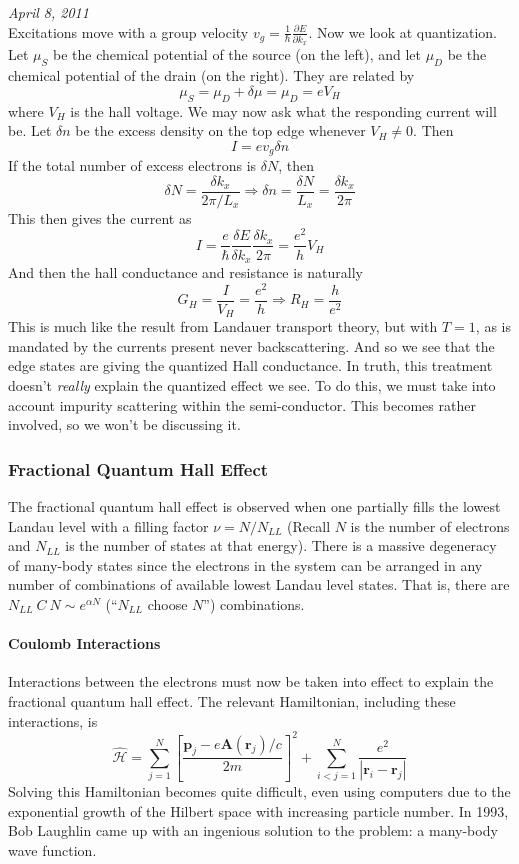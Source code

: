 \documentclass{article}
\begin{document}
	\noindent \textit{April 8, 2011}\\
	
	\noindent Excitations move with a group velocity $v_g=\frac{1}{\hbar}\frac{\partial E}{\partial k_x}$. Now we look at quantization. Let $\mu_S$ be the chemical potential of the source (on the left), and let $\mu_D$ be the chemical potential of the drain (on the right). They are related by
	$$\mu_S=\mu_D+\delta\mu=\mu_D=eV_H$$
	where $V_H$ is the hall voltage. We may now ask what the responding current will be. Let $\delta n$ be the excess density on the top edge whenever $V_H\neq 0$. Then 
	$$I=ev_g\delta n$$
	If the total number of excess electrons is $\delta N$, then
	$$\delta N=\frac{\delta k_x}{2\pi/L_x}\Rightarrow \delta n=\frac{\delta N}{L_x}=\frac{\delta k_x}{2\pi}$$
	This then gives the current as
	$$I=\frac{e}{\hbar}\frac{\delta E}{\delta k_x}\frac{\delta k_x}{2\pi}=\frac{e^2}{h}V_{H}$$
	And then the hall conductance and resistance is naturally
	$$G_H=\frac{I}{V_H}=\frac{e^2}{h}\Rightarrow R_H=\frac{h}{e^2}$$
	This is much like the result from Landauer transport theory, but with $T=1$, as is mandated by the currents present never backscattering. And so we see that the edge states are giving the quantized Hall conductance. In truth, this treatment doesn't \emph{really} explain the quantized effect we see. To do this, we must take into account impurity scattering within the semi-conductor. This becomes rather involved, so we won't be discussing it.
	
	\subsubsection{Fractional Quantum Hall Effect}
	The fractional quantum hall effect is observed when one partially fills the lowest Landau level with a filling factor $\nu=N/N_{LL}$ (Recall $N$ is the number of electrons and $N_{LL}$ is the number of states at that energy). There is a massive degeneracy of many-body states since the electrons in the system can be arranged in any number of combinations of available lowest Landau level states. That is, there are $N_{LL}\ C\ N\sim e^{\alpha N}$ (``$N_{LL}$ choose $N$'') combinations.
	\paragraph{Coulomb Interactions} Interactions between the electrons must now be taken into effect to explain the fractional quantum hall effect. The relevant Hamiltonian, including these interactions, is
	$$\hat{\mathscr{H}}=\sum_{j=1}^N\left[\frac{\mathbf{p}_j-e\mathbf{A}(\mathbf{r}_j)/c}{2m}\right]^2+\sum_{i<j=1}^N\frac{e^2}{\left|\mathbf{r}_i-\mathbf{r}_j\right|}$$
	Solving this Hamiltonian becomes quite difficult, even using computers due to the exponential growth of the Hilbert space with increasing particle number. In 1993, Bob Laughlin came up with an ingenious solution to the problem: a many-body wave function.
	
\end{document}
